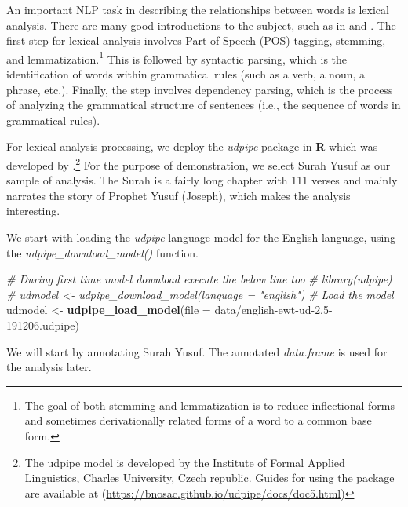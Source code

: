 \documentclass[
]{article}
\newenvironment{Shaded}{\begin{snugshade}}{\end{snugshade}}
\newcommand{\AttributeTok}[1]{\textcolor[rgb]{0.13,0.29,0.53}{#1}}
\newcommand{\CommentTok}[1]{\textcolor[rgb]{0.56,0.35,0.01}{\textit{#1}}}
\newcommand{\FunctionTok}[1]{\textcolor[rgb]{0.13,0.29,0.53}{\textbf{#1}}}
\newcommand{\NormalTok}[1]{#1}
\newcommand{\OtherTok}[1]{\textcolor[rgb]{0.56,0.35,0.01}{#1}}
\newcommand{\StringTok}[1]{\textcolor[rgb]{0.31,0.60,0.02}{#1}}
\begin{document}
An important NLP task in describing the relationships between words is lexical analysis. There are many good introductions to the subject, such as in \citet{manning1999} and \citet{manning2009}. The first step for lexical analysis involves Part-of-Speech (POS) tagging, stemming, and lemmatization.\footnote{The goal of both stemming and lemmatization is to reduce inflectional forms and sometimes derivationally related forms of a word to a common base form.} This is followed by syntactic parsing, which is the identification of words within grammatical rules (such as a verb, a noun, a phrase, etc.). Finally, the step involves dependency parsing, which is the process of analyzing the grammatical structure of sentences (i.e., the sequence of words in grammatical rules).

For lexical analysis processing, we deploy the \emph{udpipe} package in \textbf{R} which was developed by \citet{udpipe}.\footnote{The udpipe model is developed by the Institute of Formal Applied Linguistics, Charles University, Czech republic. Guides for using the package are available at (\url{https://bnosac.github.io/udpipe/docs/doc5.html})} For the purpose of demonstration, we select Surah Yusuf as our sample of analysis. The Surah is a fairly long chapter with 111 verses and mainly narrates the story of Prophet Yusuf (Joseph), which makes the analysis interesting.

We start with loading the \emph{udpipe} language model for the English language, using the \emph{udpipe\_download\_model()} function.

\footnotesize

\begin{Shaded}
\begin{Highlighting}[]
\CommentTok{\# During first time model download execute the below line too}
\CommentTok{\# library(udpipe)}
\CommentTok{\# udmodel \textless{}{-} udpipe\_download\_model(language = "english")}
\CommentTok{\# Load the model}
\NormalTok{udmodel }\OtherTok{\textless{}{-}} \FunctionTok{udpipe\_load\_model}\NormalTok{(}\AttributeTok{file =} \StringTok{\textquotesingle{}data/english{-}ewt{-}ud{-}2.5{-}191206.udpipe\textquotesingle{}}\NormalTok{)}
\end{Highlighting}
\end{Shaded}

\normalsize

We will start by annotating Surah Yusuf. The annotated \emph{data.frame} is used for the analysis later.

\footnotesize
\end{document}
